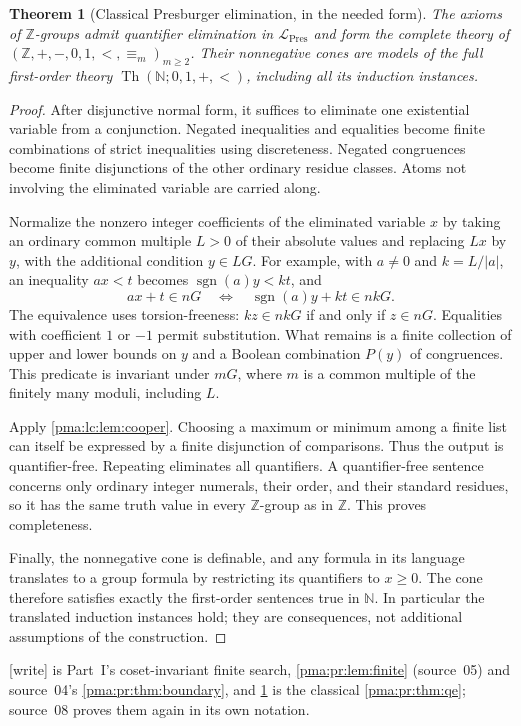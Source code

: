 \documentclass[11pt]{article}
\numberwithin{equation}{section}
\newtheorem{theorem}{Theorem}[section]
\theoremstyle{definition}
\theoremstyle{remark}
\newcommand{\N}{\mathbb N}
\newcommand{\Z}{\mathbb Z}
\newcommand{\Th}{\operatorname{Th}}
\newcommand{\writetag}{\textup{\textsf{\small[write]}}}
\newcommand{\sgn}{\operatorname{sgn}}
\newcommand{\pres}{\mathcal L_{\mathrm{Pres}}}
\begin{document}
\begin{theorem}[Classical Presburger elimination, in the needed form]
\label{pma:lc:thm:qe}
The axioms of $\Z$-groups admit quantifier elimination in $\pres$ and
form the complete theory of $(\Z,+,-,0,1,<,\equiv_m)_{m\ge2}$.
Their nonnegative cones are models of the full first-order theory
$\Th(\N;0,1,+,<)$, including all its induction instances.
\end{theorem}
\begin{proof}
After disjunctive normal form, it suffices to eliminate one existential
variable from a conjunction. Negated inequalities and equalities become
finite combinations of strict inequalities using discreteness. Negated
congruences become finite disjunctions of the other ordinary residue
classes. Atoms not involving the eliminated variable are carried along.

Normalize the nonzero integer coefficients of the eliminated variable
$x$ by taking an ordinary common multiple $L>0$ of their absolute values
and replacing $Lx$ by $y$, with the additional condition $y\in LG$.
For example, with $a\ne0$ and $k=L/|a|$, an inequality $ax<t$ becomes
$\sgn(a)y<kt$, and
\[
 ax+t\in nG\quad\Longleftrightarrow\quad
 \sgn(a)y+kt\in nkG.
\]
The equivalence uses torsion-freeness: $kz\in nkG$ if and only if
$z\in nG$. Equalities with coefficient $1$ or $-1$ permit substitution.
What remains is a finite collection of upper and lower bounds on $y$
and a Boolean combination $P(y)$ of congruences. This predicate is
invariant under $mG$, where $m$ is a common multiple of the finitely
many moduli, including $L$.

Apply \cref{pma:lc:lem:cooper}. Choosing a maximum or minimum among a finite
list can itself be expressed by a finite disjunction of comparisons.
Thus the output is quantifier-free. Repeating eliminates all quantifiers.
A quantifier-free sentence concerns only ordinary integer numerals,
their order, and their standard residues, so it has the same truth value
in every $\Z$-group as in $\Z$. This proves completeness.

Finally, the nonnegative cone is definable, and any formula in its
language translates to a group formula by restricting its quantifiers
to $x\ge0$. The cone therefore satisfies exactly the first-order
sentences true in $\N$. In particular the translated induction instances
hold; they are consequences, not additional assumptions of the construction.
\end{proof}

\noindent\writetag{}  is Part~I's coset-invariant
finite search, \cref{pma:pr:lem:finite} (source~05) and source~04's
\cref{pma:pr:thm:boundary}, and \cref{pma:lc:thm:qe} is the classical
\cref{pma:pr:thm:qe}; source~08 proves them again in its own notation.
\end{document}
